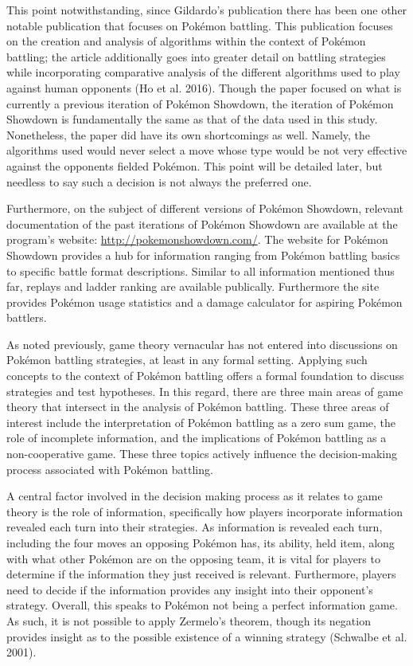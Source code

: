 \documentclass[12pt,twoside]{reedthesis}
\begin{document}
  This point notwithstanding, since Gildardo's publication there has been
  one other notable publication that focuses on Pokémon battling. This
  publication focuses on the creation and analysis of algorithms within
  the context of Pokémon battling; the article additionally goes into
  greater detail on battling strategies while incorporating comparative
  analysis of the different algorithms used to play against human
  opponents (Ho et al. 2016). Though the paper focused on what is
  currently a previous iteration of Pokémon Showdown, the iteration of
  Pokémon Showdown is fundamentally the same as that of the data used in
  this study. Nonetheless, the paper did have its own shortcomings as
  well. Namely, the algorithms used would never select a move whose type
  would be not very effective against the opponents fielded Pokémon. This
  point will be detailed later, but needless to say such a decision is not
  always the preferred one.
  
  Furthermore, on the subject of different versions of Pokémon Showdown,
  relevant documentation of the past iterations of Pokémon Showdown are
  available at the program's website: \url{http://pokemonshowdown.com/}.
  The website for Pokémon Showdown provides a hub for information ranging
  from Pokémon battling basics to specific battle format descriptions.
  Similar to all information mentioned thus far, replays and ladder
  ranking are available publically. Furthermore the site provides Pokémon
  usage statistics and a damage calculator for aspiring Pokémon battlers.
  
  As noted previously, game theory vernacular has not entered into
  discussions on Pokémon battling strategies, at least in any formal
  setting. Applying such concepts to the context of Pokémon battling
  offers a formal foundation to discuss strategies and test hypotheses. In
  this regard, there are three main areas of game theory that intersect in
  the analysis of Pokémon battling. These three areas of interest include
  the interpretation of Pokémon battling as a zero sum game, the role of
  incomplete information, and the implications of Pokémon battling as a
  non-cooperative game. These three topics actively influence the
  decision-making process associated with Pokémon battling.
  
  A central factor involved in the decision making process as it relates
  to game theory is the role of information, specifically how players
  incorporate information revealed each turn into their strategies. As
  information is revealed each turn, including the four moves an opposing
  Pokémon has, its ability, held item, along with what other Pokémon are
  on the opposing team, it is vital for players to determine if the
  information they just received is relevant. Furthermore, players need to
  decide if the information provides any insight into their opponent's
  strategy. Overall, this speaks to Pokémon not being a perfect
  information game. As such, it is not possible to apply Zermelo's
  theorem, though its negation provides insight as to the possible
  existence of a winning strategy (Schwalbe et al. 2001).
  
\end{document}
